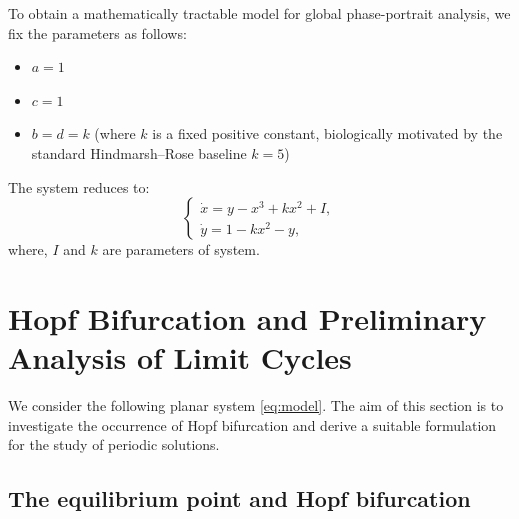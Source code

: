\documentclass[11pt,reqno]{amsart}
\theoremstyle{plain}
\theoremstyle{definition}
\theoremstyle{remark}
\begin{document}
To obtain a mathematically tractable model for global phase-portrait analysis, we fix the parameters as follows:
\begin{itemize}
    \item \(a = 1\)
    \item \(c = 1\)
    \item \(b = d = k\) (where \(k\) is a fixed positive constant, biologically motivated by the standard Hindmarsh--Rose baseline \(k=5\))
\end{itemize}

The system reduces to:
\begin{equation}
\label{eq:model}
\begin{cases}
\dot{x}=y-x^3+kx^2+I,\\[1mm]
\dot{y}=1-kx^2-y,
\end{cases}
\end{equation}
where, \(I\) and $k$ are parameters of system.

\section{Hopf Bifurcation and Preliminary Analysis of Limit Cycles}
\label{sec hopf}
We consider the following planar system
\eqref{eq:model}. The aim of this section is to
investigate the occurrence of Hopf bifurcation and derive a suitable
formulation for the study of periodic solutions.

\subsection{The equilibrium point and Hopf bifurcation}
\end{document}
